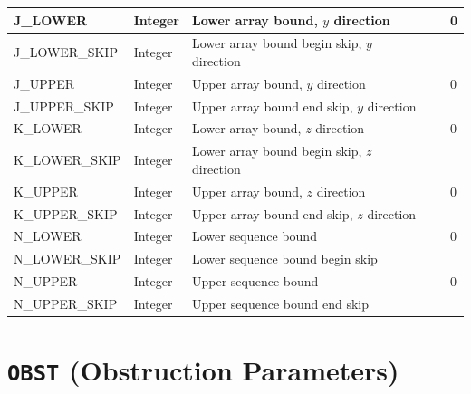 \documentclass[11pt]{book}
\begin{document}
\begin{longtable}{@{\extracolsep{\fill}}|l|l|l|l|l|}
{\ct J\_LOWER}       & Integer          & Lower array bound, $y$ direction            &    & 0                          \\ \hline
{\ct J\_LOWER\_SKIP} & Integer          & Lower array bound begin skip, $y$ direction &    &                            \\ \hline
{\ct J\_UPPER}       & Integer          & Upper array bound, $y$ direction            &    & 0                          \\ \hline
{\ct J\_UPPER\_SKIP} & Integer          & Upper array bound end skip, $y$ direction   &    &                            \\ \hline
{\ct K\_LOWER}       & Integer          & Lower array bound, $z$ direction            &    & 0                          \\ \hline
{\ct K\_LOWER\_SKIP} & Integer          & Lower array bound begin skip, $z$ direction &    &                            \\ \hline
{\ct K\_UPPER}       & Integer          & Upper array bound, $z$ direction            &    & 0                          \\ \hline
{\ct K\_UPPER\_SKIP} & Integer          & Upper array bound end skip, $z$ direction   &    &                            \\ \hline
{\ct N\_LOWER}       & Integer          & Lower sequence bound                        &    & 0                          \\ \hline
{\ct N\_LOWER\_SKIP} & Integer          & Lower sequence bound begin skip             &    &                            \\ \hline
{\ct N\_UPPER}       & Integer          & Upper sequence bound                        &    & 0                          \\ \hline
{\ct N\_UPPER\_SKIP} & Integer          & Upper sequence bound end skip               &    &                            \\ \hline
\end{longtable}


\vspace{\baselineskip}



\section{\texorpdfstring{{\tt OBST}}{OBST} (Obstruction Parameters)}
\end{document}

